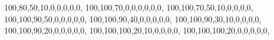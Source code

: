 {100,80,50,10,0,0,0,0,0},
{100,100,70,0,0,0,0,0,0},
{100,100,70,50,10,0,0,0,0},
{100,100,90,50,0,0,0,0,0},
{100,100,90,40,0,0,0,0,0},
{100,100,90,30,10,0,0,0,0},
{100,100,90,20,0,0,0,0,0},
{100,100,100,20,10,0,0,0,0},
{100,100,100,20,0,0,0,0,0},
